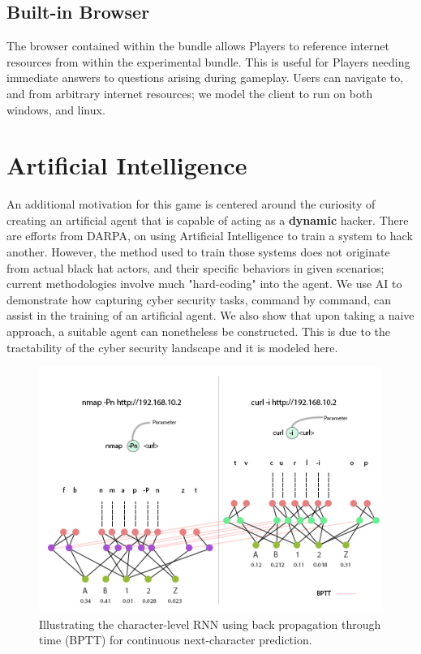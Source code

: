 \documentclass[10pt, titlepage, twocolumn]{article}
\newcommand{\ii}{\indent\indent}
\begin{document}
\subsection{Built-in Browser}
\ii
The browser contained within the bundle allows Players to reference internet resources from within the experimental bundle. This is useful for Players needing immediate answers to questions arising during gameplay. Users can navigate to, and from arbitrary internet resources; we model the client to run on both windows, and linux.


\section{Artificial Intelligence}


An additional motivation for this game is centered around the curiosity of creating an artificial agent that is capable of acting as a \textbf{dynamic} hacker. There are efforts from DARPA, on using Artificial Intelligence to train a system to hack another. However, the method used to train those systems does not originate from actual black hat actors, and their specific behaviors in given scenarios; current methodologies involve much "hard-coding" into the agent. We use AI to demonstrate how capturing cyber security tasks, command by command, can assist in the training of an artificial agent. We also show that upon taking a naive approach, a suitable agent can nonetheless be constructed. This is due to the tractability of the cyber security landscape and it is modeled here.

\begin{figure}[ht]
\centering
	\includegraphics[width=\textwidth]{ainn}
	\caption{Illustrating the character-level RNN using back propagation through time (BPTT) for continuous next-character prediction. }
	\label{ainn}
\end{figure}
\end{document}
